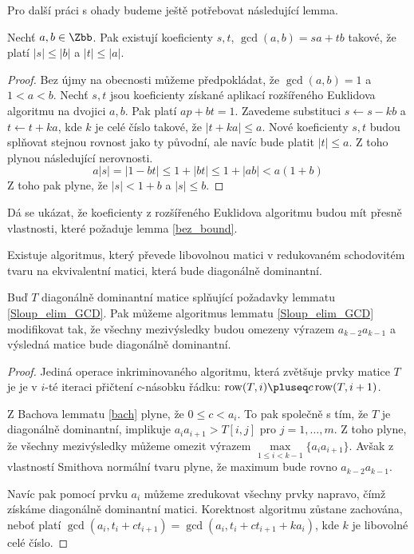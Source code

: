 Pro další práci s ohady budeme ještě potřebovat následující lemma.
\begin{lem} \label{bez_bound}
Nechť $ a, b \in \Zbb $. Pak existují koeficienty
$ s, t $, $ \gcd(a, b) = s a + t b $ takové, že platí $ |s| \leq |b| $ a
$ |t| \leq |a| $.
\end{lem}
\begin{proof}
Bez újmy na obecnosti můžeme předpokládat, že $ \gcd(a, b) = 1 $ a $ 1 < a < b $.
Nechť $ s, t $ jsou koeficienty získané aplikací rozšířeného Euklidova algoritmu
na dvojici $ a, b $. Pak platí $ a p + b t = 1 $. Zavedeme substituci
$ s \leftarrow s - k b $ a $ t \leftarrow t + k a $, kde $ k $ je celé číslo takové, že
$ |t + k a| \leq a $. Nové koeficienty $ s,t $ budou splňovat stejnou rovnost
jako ty původní, ale navíc bude platit $ |t| \leq a $. Z toho plynou následující
nerovnosti.
\begin{equation*}
    a |s| = | 1 - bt | \leq 1 + |bt| \leq 1 + |ab| < a(1 + b)
\end{equation*}
Z toho pak plyne, že $ |s| < 1 + b $ a $ |s| \leq b $.
\end{proof}
\begin{pozn}
Dá se ukázat, že koeficienty z rozšířeného Euklidova algoritmu budou mít přesně
vlastnosti, které požaduje lemma \ref{bez_bound}.
\end{pozn}



\begin{lem}
Existuje algoritmus, který převede libovolnou matici v redukovaném schodovitém
tvaru na ekvivalentní matici, která bude diagonálně dominantní.
\end{lem}



\begin{lem} \label{Sloup_elim_GCD_modified}
Buď $ T $ diagonálně dominantní matice splňující požadavky lemmatu \ref{Sloup_elim_GCD}.
Pak můžeme algoritmus lemmatu \ref{Sloup_elim_GCD} modifikovat tak, že všechny
mezivýsledky budou omezeny výrazem $ a_{k - 2} a_{k - 1} $ 
a výsledná matice bude diagonálně dominantní.
\end{lem}
\begin{proof}
Jediná operace inkriminovaného algoritmu, která zvětšuje prvky matice $ T $ je
je v $ i $-té iteraci přičtení $ c $-násobku řádku: 
$ \operatorname{row}(T, i) \pluseq c \operatorname{row}(T, i + 1) $.

Z Bachova lemmatu \ref{bach} plyne, že $ 0 \leq c < a_i $. To pak společně s
tím, že $ T $ je diagonálně dominantní, implikuje $ a_i a_{i+1} > T[i, j] $ pro
$ j = 1, \dots, m $. Z toho plyne, že všechny mezivýsledky můžeme omezit výrazem
$ \max\limits_{1 \leq i < k - 1}\{ a_i a_{i+1} \} $. Avšak z vlastností Smithova
normální tvaru plyne, že maximum bude rovno $ a_{k - 2} a_{k - 1} $.

Navíc pak pomocí prvku
$ a_i $ můžeme zredukovat všechny prvky napravo, čímž získáme diagonálně dominantní
matici. Korektnost algoritmu zůstane zachována, neboť platí
$ \gcd(a_i, t_{i} + ct_{i+1}) = \gcd(a_i, t_{i} + ct_{i+1} + k a_i) $,
kde $ k $ je libovolné celé číslo.
\end{proof}




